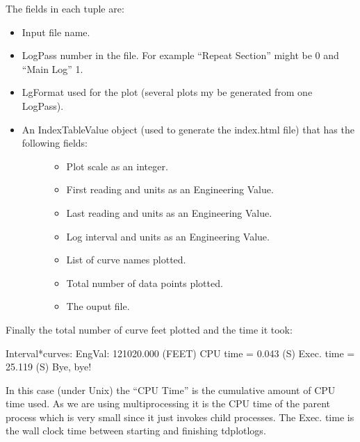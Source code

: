 \documentclass[letterpaper,10pt,english]{sphinxmanual}
\begin{document}
The fields in each tuple are:
\begin{itemize}
\item {} 
Input file name.

\item {} 
LogPass number in the file. For example “Repeat Section” might be 0 and “Main Log” 1.

\item {} 
LgFormat used for the plot (several plots my be generated from one LogPass).

\item {} \begin{description}
\item[{An IndexTableValue object (used to generate the index.html file) that has the following fields:}] \leavevmode\begin{itemize}
\item {} 
Plot scale as an integer.

\item {} 
First reading and units as an Engineering Value.

\item {} 
Last reading and units as an Engineering Value.

\item {} 
Log interval and units as an Engineering Value.

\item {} 
List of curve names plotted.

\item {} 
Total number of data points plotted.

\item {} 
The ouput file.

\end{itemize}

\end{description}

\end{itemize}

Finally the total number of curve feet plotted and the time it took:

\begin{sphinxVerbatim}[commandchars=\\\{\}]
Interval*curves: EngVal: 121020.000 (FEET)
  CPU time =    0.043 (S)
Exec. time =   25.119 (S)
Bye, bye!
\end{sphinxVerbatim}

In this case (under Unix) the “CPU Time” is the cumulative amount of CPU time used. As we are using multiprocessing it is the CPU time of the parent process which is very small since it just invokes child processes. The Exec. time is the wall clock time between starting and finishing tdplotlogs.
\end{document}
